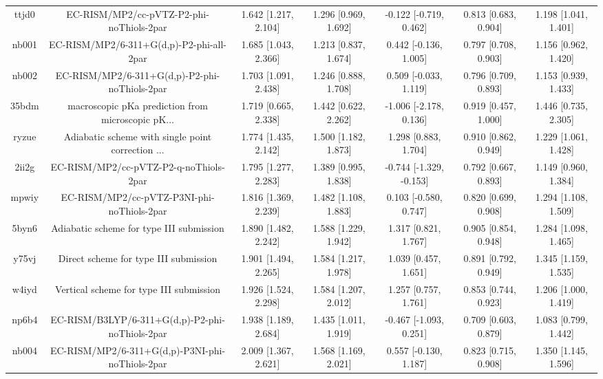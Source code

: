 \documentclass{article}
\begin{document}
\begin{center}
\begin{longtable}{|ccccccc|}
 ttjd0 &           EC-RISM/MP2/cc-pVTZ-P2-phi-noThiols-2par &  1.642 [1.217, 2.104] &  1.296 [0.969, 1.692] &   -0.122 [-0.719, 0.462] &  0.813 [0.683, 0.904] &   1.198 [1.041, 1.401] \\
 nb001 &           EC-RISM/MP2/6-311+G(d,p)-P2-phi-all-2par &  1.685 [1.043, 2.366] &  1.213 [0.837, 1.674] &    0.442 [-0.136, 1.005] &  0.797 [0.708, 0.903] &   1.156 [0.962, 1.420] \\
 nb002 &      EC-RISM/MP2/6-311+G(d,p)-P2-phi-noThiols-2par &  1.703 [1.091, 2.438] &  1.246 [0.888, 1.708] &    0.509 [-0.033, 1.119] &  0.796 [0.709, 0.893] &   1.153 [0.939, 1.433] \\
 35bdm &  macroscopic pKa prediction from microscopic pK... &  1.719 [0.665, 2.338] &  1.442 [0.622, 2.262] &   -1.006 [-2.178, 0.136] &  0.919 [0.457, 1.000] &   1.446 [0.735, 2.305] \\
 ryzue &  Adiabatic scheme with single point correction ... &  1.774 [1.435, 2.142] &  1.500 [1.182, 1.873] &     1.298 [0.883, 1.704] &  0.910 [0.862, 0.949] &   1.229 [1.061, 1.428] \\
 2ii2g &             EC-RISM/MP2/cc-pVTZ-P2-q-noThiols-2par &  1.795 [1.277, 2.283] &  1.389 [0.995, 1.838] &  -0.744 [-1.329, -0.153] &  0.792 [0.667, 0.893] &   1.149 [0.960, 1.384] \\
 mpwiy &         EC-RISM/MP2/cc-pVTZ-P3NI-phi-noThiols-2par &  1.816 [1.369, 2.239] &  1.482 [1.108, 1.883] &    0.103 [-0.580, 0.747] &  0.820 [0.699, 0.908] &   1.294 [1.108, 1.509] \\
 5byn6 &           Adiabatic scheme for type III submission &  1.890 [1.482, 2.242] &  1.588 [1.229, 1.942] &     1.317 [0.821, 1.767] &  0.905 [0.854, 0.948] &   1.284 [1.098, 1.465] \\
 y75vj &              Direct scheme for type III submission &  1.901 [1.494, 2.265] &  1.584 [1.217, 1.978] &     1.039 [0.457, 1.651] &  0.891 [0.792, 0.949] &   1.345 [1.159, 1.535] \\
 w4iyd &            Vertical scheme for type III submission &  1.926 [1.524, 2.298] &  1.584 [1.207, 2.012] &     1.257 [0.757, 1.761] &  0.853 [0.744, 0.923] &   1.206 [1.000, 1.419] \\
 np6b4 &    EC-RISM/B3LYP/6-311+G(d,p)-P2-phi-noThiols-2par &  1.938 [1.189, 2.684] &  1.435 [1.011, 1.919] &   -0.467 [-1.093, 0.251] &  0.709 [0.603, 0.879] &   1.083 [0.799, 1.442] \\
 nb004 &    EC-RISM/MP2/6-311+G(d,p)-P3NI-phi-noThiols-2par &  2.009 [1.367, 2.621] &  1.568 [1.169, 2.021] &    0.557 [-0.130, 1.187] &  0.823 [0.715, 0.908] &   1.350 [1.145, 1.596] \\

\end{longtable}
\end{center}
\end{document}
